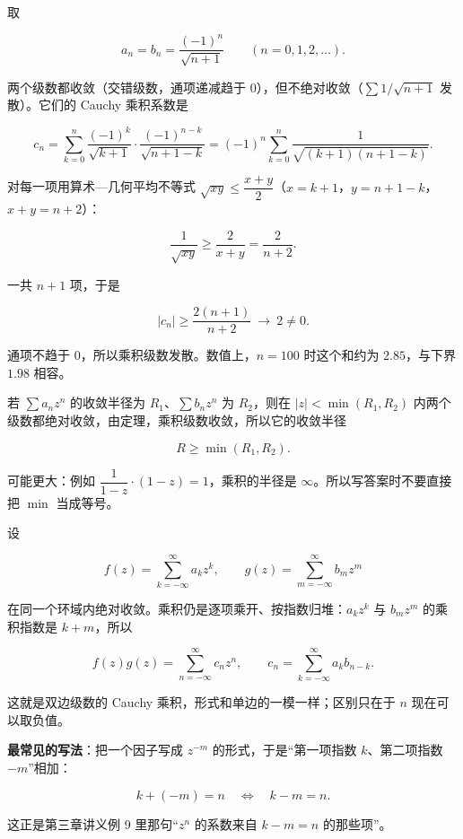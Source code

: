 \documentclass[11pt]{ctexart}
\let\origsubhdr\subhdr
\renewcommand{\subhdr}[1]{\par\needspace{4\baselineskip}\origsubhdr{#1}}
\let\orighdr\hdr
\renewcommand{\hdr}[2]{\par\needspace{9\baselineskip}\orighdr{#1}{#2}}
\begin{document}

取

\[ a_n=b_n=\frac{(-1)^n}{\sqrt{n+1}}\qquad(n=0,1,2,\dots) . \]

两个级数都收敛（交错级数，通项递减趋于 0），但不绝对收敛（$\sum1/\sqrt{n+1}$ 发散）。它们的 Cauchy 乘积系数是

\[ c_n=\sum_{k=0}^{n}\frac{(-1)^k}{\sqrt{k+1}}\cdot\frac{(-1)^{n-k}}{\sqrt{n+1-k}}=(-1)^n\sum_{k=0}^{n}\frac{1}{\sqrt{(k+1)(n+1-k)}} . \]

对每一项用算术—几何平均不等式 $\sqrt{xy}\le\dfrac{x+y}{2}$（$x=k+1$，$y=n+1-k$，$x+y=n+2$）：

\[ \frac{1}{\sqrt{xy}}\ge\frac{2}{x+y}=\frac{2}{n+2} . \]

一共 $n+1$ 项，于是

\[ |c_n|\ge\frac{2(n+1)}{n+2}\ \longrightarrow\ 2\ne0 . \]

通项不趋于 0，所以乘积级数发散。数值上，$n=100$ 时这个和约为 $2.85$，与下界 $1.98$ 相容。


若 $\sum a_nz^n$ 的收敛半径为 $R_1$、$\sum b_nz^n$ 为 $R_2$，则在 $|z|<\min(R_1,R_2)$ 内两个级数都绝对收敛，由定理，乘积级数收敛，所以它的收敛半径

\[ R\ge\min(R_1,R_2) . \]

可能更大：例如 $\dfrac{1}{1-z}\cdot(1-z)=1$，乘积的半径是 $\infty$。所以写答案时不要直接把 $\min$ 当成等号。



设

\[ f(z)=\sum_{k=-\infty}^{\infty}a_kz^k,\qquad g(z)=\sum_{m=-\infty}^{\infty}b_mz^m \]

在同一个环域内绝对收敛。乘积仍是逐项乘开、按指数归堆：$a_kz^k$ 与 $b_mz^m$ 的乘积指数是 $k+m$，所以

\[ f(z)g(z)=\sum_{n=-\infty}^{\infty}c_nz^n,\qquad c_n=\sum_{k=-\infty}^{\infty}a_kb_{n-k} . \]

这就是双边级数的 Cauchy 乘积，形式和单边的一模一样；区别只在于 $n$ 现在可以取负值。

\textbf{最常见的写法}：把一个因子写成 $z^{-m}$ 的形式，于是“第一项指数 $k$、第二项指数 $-m$”相加：

\[ k+(-m)=n\quad\Longleftrightarrow\quad k-m=n . \]

这正是第三章讲义例 9 里那句“$z^n$ 的系数来自 $k-m=n$ 的那些项”。
\end{document}
